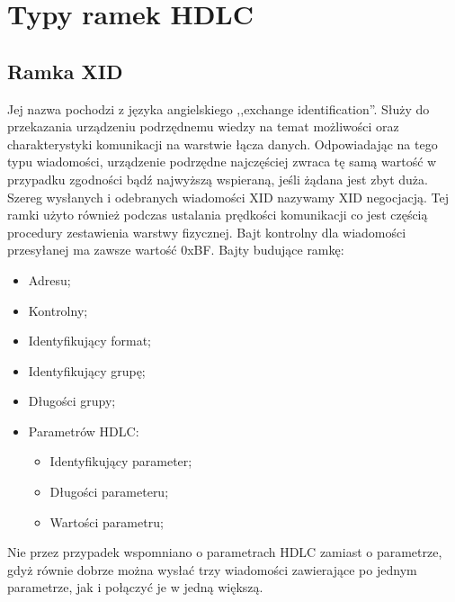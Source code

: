 \section{Typy ramek HDLC}
	\subsection{Ramka XID}
	Jej nazwa pochodzi z języka angielskiego ,,exchange identification''. 
	Służy do przekazania urządzeniu podrzędnemu wiedzy na temat możliwości oraz charakterystyki komunikacji na warstwie łącza danych.\autocite{WIKI_ENG_HDLC}
	Odpowiadając na tego typu wiadomości, urządzenie podrzędne najczęściej zwraca tę samą wartość w przypadku zgodności 
	bądź najwyższą wspieraną, jeśli żądana jest zbyt duża. Szereg wysłanych i odebranych wiadomości XID nazywamy XID negocjacją.
	Tej ramki użyto również podczas ustalania prędkości komunikacji co jest częścią procedury zestawienia warstwy fizycznej.
	Bajt kontrolny dla wiadomości przesyłanej ma zawsze wartość 0xBF. \newline
	Bajty budujące ramkę:
	\begin{itemize}
		\item Adresu;
		\item Kontrolny;
		\item Identyfikujący format;
		\item Identyfikujący grupę;
		\item Długości grupy;
		\item Parametrów HDLC:
		\begin{itemize}
			\item Identyfikujący parameter;
			\item Długości parameteru;
			\item Wartości parametru;
		\end{itemize}
	\end{itemize} 
	Nie przez przypadek wspomniano o parametrach HDLC zamiast o parametrze, gdyż równie dobrze można wysłać
    trzy wiadomości zawierające po jednym parametrze, jak i połączyć je w jedną większą.
	